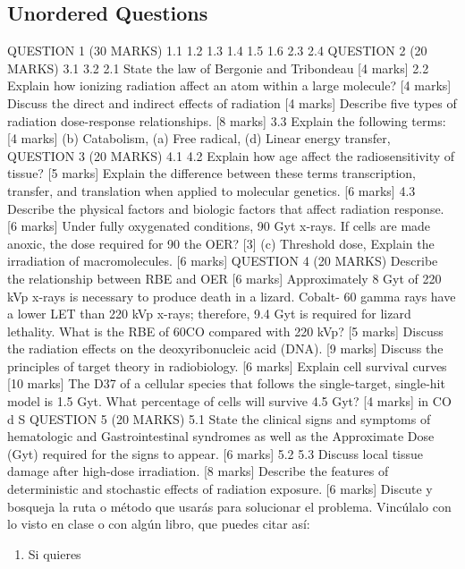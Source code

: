 \documentclass{assignment}
\begin{document}
\begin{problem}
\section{Unordered Questions}
\noindent 
QUESTION 1 (30 MARKS)
1.1
1.2
1.3
1.4
1.5
1.6
2.3
2.4
QUESTION 2 (20 MARKS)
3.1
3.2
2.1 State the law of Bergonie and Tribondeau [4 marks]
2.2
Explain how ionizing radiation affect an atom within a large molecule? [4 marks]
Discuss the direct and indirect effects of radiation [4 marks]
Describe five types of radiation dose-response relationships. [8 marks]
3.3
Explain the following terms: [4 marks]
(b) Catabolism,
(a) Free radical,
(d) Linear energy transfer,
QUESTION 3 (20 MARKS)
4.1
4.2
Explain how age affect the radiosensitivity of tissue? [5 marks]
Explain the difference between these terms transcription, transfer, and translation when
applied to molecular genetics. [6 marks]
4.3
Describe the physical factors and biologic factors that affect radiation response. [6 marks]
Under fully oxygenated conditions, 90%
Gyt x-rays. If cells are made anoxic, the dose required for 90%
the OER? [3]
(c) Threshold dose,
Explain the irradiation of macromolecules. [6 marks]
QUESTION 4 (20 MARKS)
Describe the relationship between RBE and OER [6 marks]
Approximately 8 Gyt of 220 kVp x-rays is necessary to produce death in a lizard. Cobalt-
60 gamma rays have a lower LET than 220 kVp x-rays; therefore, 9.4 Gyt is required for
lizard lethality. What is the RBE of 60CO compared with 220 kVp? [5 marks]
Discuss the radiation effects on the deoxyribonucleic acid (DNA). [9 marks]
Discuss the principles of target theory in radiobiology. [6 marks]
Explain cell survival curves [10 marks]
The D37 of a cellular species that follows the single-target, single-hit model is 1.5 Gyt.
What percentage of cells will survive 4.5 Gyt? [4 marks]
in
CO
d
S
QUESTION 5 (20 MARKS)
5.1 State the clinical signs and symptoms of hematologic and Gastrointestinal syndromes as
well as the Approximate Dose (Gyt) required for the signs to appear. [6 marks]
5.2
5.3
Discuss local tissue damage after high-dose irradiation. [8 marks]
Describe the features of deterministic and stochastic effects of radiation exposure.
[6 marks]
\noindent Discute y bosqueja la ruta o método que usarás para solucionar el problema. Vincúlalo con lo visto en clase o con algún libro, que puedes citar así: \cite{GustavoLopez}

\begin{enumerate}
    \item Si quieres


\end{enumerate}
\end{problem}
\end{document}
